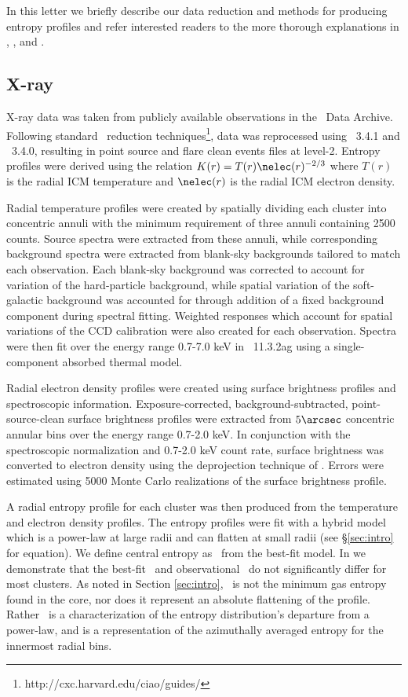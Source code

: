 \documentclass{emulateapj}
\begin{document}
In this letter we briefly describe our data reduction and methods for
producing entropy profiles and refer interested readers to the more
thorough explanations in \cite{d06}, \cite{accept}, and
\cite{xrayband}.

\subsection{X-ray}
\label{sec:xray}

X-ray data was taken from publicly available observations in the
\Chandra\ Data Archive. Following standard \Ciao\ reduction
techniques\footnote{http://cxc.harvard.edu/ciao/guides/}, data was
reprocessed using \Ciao\ 3.4.1 and \Caldb\ 3.4.0, resulting in point
source and flare clean events files at level-2. Entropy profiles were
derived using the relation $K(r) = T(r) \nelec(r)^{-2/3}$ where $T(r)$
is the radial ICM temperature and $\nelec(r)$ is the radial ICM
electron density.

Radial temperature profiles were created by spatially dividing each
cluster into concentric annuli with the minimum requirement of three
annuli containing 2500 counts. Source spectra were extracted from
these annuli, while corresponding background spectra were extracted
from blank-sky backgrounds tailored to match each observation. Each
blank-sky background was corrected to account for variation of the
hard-particle background, while spatial variation of the soft-galactic
background was accounted for through addition of a fixed background
component during spectral fitting. Weighted responses which account
for spatial variations of the CCD calibration were also created for
each observation. Spectra were then fit over the energy range 0.7-7.0
keV in \xspec\ 11.3.2ag \citep{xspec} using a single-component
absorbed thermal model.

Radial electron density profiles were created using surface brightness
profiles and spectroscopic information. Exposure-corrected,
background-subtracted, point-source-clean surface brightness profiles
were extracted from $5\arcsec$ concentric annular bins over the energy
range 0.7-2.0 keV. In conjunction with the spectroscopic normalization
and 0.7-2.0 keV count rate, surface brightness was converted to
electron density using the deprojection technique of
\cite{kriss83}. Errors were estimated using 5000 Monte Carlo
realizations of the surface brightness profile.

A radial entropy profile for each cluster was then produced from the
temperature and electron density profiles. The entropy profiles were
fit with a hybrid model which is a power-law at large radii and can
flatten at small radii (see \S\ref{sec:intro} for equation). We define
central entropy as \kna\ from the best-fit model. In \cite{accept} we
demonstrate that the best-fit \kna\ and observational \kna\ do not
significantly differ for most clusters. As noted in Section
\ref{sec:intro}, \kna\ is not the minimum gas entropy found in the
core, nor does it represent an absolute flattening of the
profile. Rather \kna\ is a characterization of the entropy
distribution's departure from a power-law, and is a representation of
the azimuthally averaged entropy for the innermost radial bins.
\end{document}
